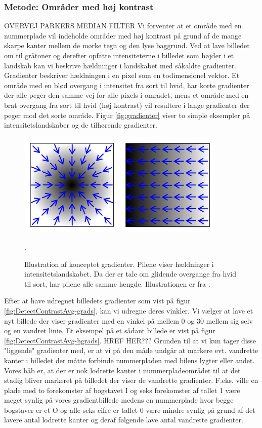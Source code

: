 \subsubsection{Metode: Områder med høj kontrast}
\label{sec:DetectContrastAvg}
OVERVEJ PARKERS MEDIAN FILTER
Vi forventer at et område med en nummerplade vil indeholde områder med høj kontrast på grund af de mange skarpe kanter mellem de mørke tegn og den lyse baggrund. Ved at lave billedet om til gråtoner og derefter opfatte intensiteterne i billedet som højder i et landskab kan vi beskrive hældninger i landskabet med såkaldte gradienter. Gradienter beskriver hældningen i en pixel som en todimensionel vektor. Et område med en blød overgang i intensitet fra sort til hvid, har korte gradienter der alle peger den samme vej for alle pixels i området, mens et område med en brat overgang fra sort til hvid (høj kontrast) vil resultere i lange gradienter der peger mod det sorte område. Figur \vref{fig:gradienter} viser to simple eksempler på intensitetslandskaber og de tilhørende gradienter.

\begin{figure}[htp]
\centering
\includegraphics[width=10cm]{system/illu/gradienter.png} 
\caption{Illustration af konceptet gradienter. Pilene viser hældninger i intensitetslandskabet. Da der er tale om glidende overgange fra hvid til sort, har pilene alle samme længde. Illustrationen er fra \cite{wiki_gradienter}.}.
\label{fig:gradienter}
\end{figure}

Efter at have udregnet billedets gradienter som vist på figur \vref{fig:DetectContrastAvg-grads}, kan vi udregne deres vinkler. Vi vælger at lave et nyt billede der viser gradienter med en vinkel på mellem 0 og 30 mellem sig selv og en vandret linie. Et eksempel på et sådant billede er vist på figur \vref{fig:DetectContrastAvg-hgrads}. HREF HER??? Grunden til at vi kun tager disse "liggende" gradienter med, er at vi på den måde undgår at markere evt. vandrette kanter i billedet der måtte forbinde nummerpladen med bilens lygter eller andet. Vores håb er, at der er nok lodrette kanter i nummerpladeområdet til at det stadig bliver markeret på billedet der viser de vandrette gradienter. F.eks. ville en plade med to forekomster af bogstavet I og seks forekomster af tallet 1 være meget synlig på vores gradientbillede medens en nummerplade hvor begge bogstaver er et O og alle seks cifre er tallet 0 være mindre synlig på grund af det lavere antal lodrette kanter og deraf følgende lave antal vandrette gradienter.

